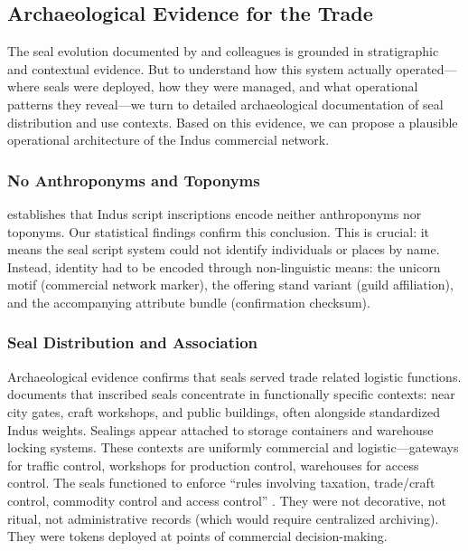 \documentclass[12pt]{article}
\begin{document}
\subsection{Archaeological Evidence for the Trade}

The seal evolution documented by \citet{kenoyer2010inscribed} and colleagues is grounded
in stratigraphic and contextual evidence. But to understand how this system actually
operated—where seals were deployed, how they were managed, and what operational patterns
they reveal—we turn to detailed archaeological documentation of seal distribution and use
contexts. Based on this evidence, we can propose a plausible operational architecture
of the Indus commercial network.

\subsubsection{No Anthroponyms and Toponyms}

\citet{mukhopadhyay2023} establishes that Indus script inscriptions encode neither
anthroponyms nor toponyms. Our statistical findings confirm this conclusion.
This is crucial: it means the seal script system could not identify individuals
or places by name. Instead, identity had to be encoded through non-linguistic means:
the unicorn motif (commercial network marker), the offering stand variant (guild
affiliation), and the accompanying attribute bundle (confirmation checksum).


\subsubsection{Seal Distribution and Association}

Archaeological evidence confirms that seals served trade related logistic functions.
\citet{mukhopadhyay2023} documents that inscribed seals concentrate in functionally
specific contexts: near city gates, craft workshops, and public buildings, often
alongside standardized Indus weights. Sealings appear attached to storage containers
and warehouse locking systems. These contexts are uniformly commercial and
logistic—gateways for traffic control, workshops for production control, warehouses
for access control. The seals functioned to enforce ``rules involving taxation,
trade/craft control, commodity control and access control'' \citep{mukhopadhyay2023}.
They were not decorative, not ritual, not administrative records (which would require
centralized archiving). They were tokens deployed at points of commercial
decision-making.
\end{document}
